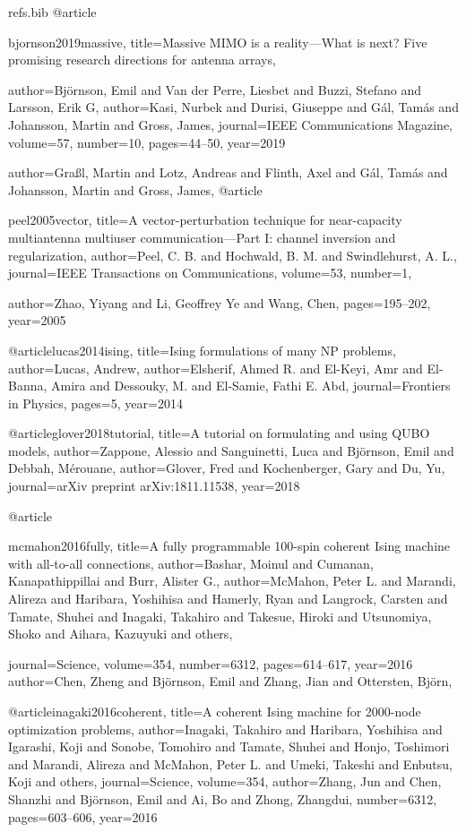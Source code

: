 {\begin{filecontents*}{refs.bib}
@article{bjornson2019massive,
  title={Massive MIMO is a reality—What is next? Five promising research directions for antenna arrays},

  author={Bj{\"o}rnson, Emil and Van der Perre, Liesbet and Buzzi, Stefano and Larsson, Erik G},
  author={Kasi, Nurbek and Durisi, Giuseppe and G{\'a}l, Tam{\'a}s and Johansson, Martin and Gross, James},
  journal={IEEE Communications Magazine},
  volume={57},
  number={10},
  pages={44--50},
  year={2019}
}

  author={Gra{\ss}l, Martin and Lotz, Andreas and Flinth, Axel and G{\'a}l, Tam{\'a}s and Johansson, Martin and Gross, James},
@article{peel2005vector,
  title={A vector-perturbation technique for near-capacity multiantenna multiuser communication—Part I: channel inversion and regularization},
  author={Peel, C. B. and Hochwald, B. M. and Swindlehurst, A. L.},
  journal={IEEE Transactions on Communications},
  volume={53},
  number={1},

  author={Zhao, Yiyang and Li, Geoffrey Ye and Wang, Chen},
  pages={195--202},
  year={2005}
}

@article{lucas2014ising,
  title={Ising formulations of many NP problems},
  author={Lucas, Andrew},
  author={Elsherif, Ahmed R. and El-Keyi, Amr and El-Banna, Amira and Dessouky, M. and El-Samie, Fathi E. Abd},
  journal={Frontiers in Physics},
  pages={5},
  year={2014}
}

@article{glover2018tutorial,
  title={A tutorial on formulating and using QUBO models},
  author={Zappone, Alessio and Sanguinetti, Luca and Bj\"ornson, Emil and Debbah, M{\'e}rouane},
  author={Glover, Fred and Kochenberger, Gary and Du, Yu},
  journal={arXiv preprint arXiv:1811.11538},
  year={2018}
}

@article{mcmahon2016fully,
  title={A fully programmable 100-spin coherent Ising machine with all-to-all connections},
  author={Bashar, Moinul and Cumanan, Kanapathippillai and Burr, Alister G.},
  author={McMahon, Peter L. and Marandi, Alireza and Haribara, Yoshihisa and Hamerly, Ryan and Langrock, Carsten and Tamate, Shuhei and Inagaki, Takahiro and Takesue, Hiroki and Utsunomiya, Shoko and Aihara, Kazuyuki and others},

  journal={Science},
  volume={354},
  number={6312},
  pages={614--617},
  year={2016}
  author={Chen, Zheng and Bj{\"o}rnson, Emil and Zhang, Jian and Ottersten, Bj{\"o}rn},
}

@article{inagaki2016coherent,
  title={A coherent Ising machine for 2000-node optimization problems},
  author={Inagaki, Takahiro and Haribara, Yoshihisa and Igarashi, Koji and Sonobe, Tomohiro and Tamate, Shuhei and Honjo, Toshimori and Marandi, Alireza and McMahon, Peter L. and Umeki, Takeshi and Enbutsu, Koji and others},
  journal={Science},
  volume={354},
  author={Zhang, Jun and Chen, Shanzhi and Bj{\"o}rnson, Emil and Ai, Bo and Zhong, Zhangdui},
  number={6312},
  pages={603--606},
  year={2016}
}


\end{filecontents*}}
